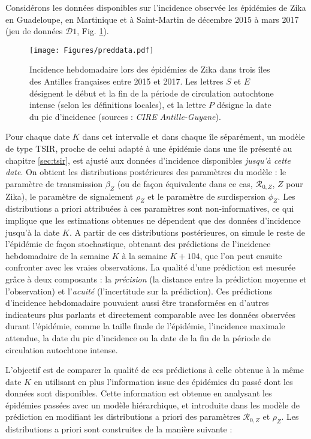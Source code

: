 Considérons les données disponibles sur l'incidence observée les épidémies de Zika en Guadeloupe, en Martinique et à Saint-Martin de décembre 2015 à mars 2017 (jeu de données $\mathcal{D}1$, Fig. \ref{fig:preddata}).
\begin{figure}[t]
	\centering
	\texttt{[image: Figures/preddata.pdf]}
	\caption{Incidence hebdomadaire lors des épidémies de Zika dans trois îles des Antilles françaises entre 2015 et 2017. Les lettres $S$ et $E$ désignent le début et la fin de la période de circulation autochtone intense (selon les définitions locales), et la lettre $P$ désigne la date du pic d'incidence (sources : {\em CIRE Antille-Guyane}).}
	\label{fig:preddata}
\end{figure}
Pour chaque date $K$ dans cet intervalle et dans chaque île séparément, un modèle de type TSIR, proche de celui adapté à une épidémie dans une île présenté au chapitre \ref{sec:tsir}, est ajusté aux données d'incidence disponibles {\em jusqu'à cette date}.
On obtient les distributions postérieures des paramètres du modèle : le paramètre de transmission $\beta_Z$ (ou de façon équivalente dans ce cas, $\mathcal{R}_{0,Z}$, $Z$ pour Zika), le paramètre de signalement $\rho_Z$ et le paramètre de surdispersion $\phi_Z$.
Les distributions a priori attribuées à ces paramètres sont non-informatives, ce qui implique que les estimations obtenues ne dépendent que des données d'incidence jusqu'à la date $K$. 
A partir de ces distributions postérieures, on simule le reste de l'épidémie de façon stochastique, obtenant des prédictions de l'incidence hebdomadaire de la semaine $K$ à la semaine $K+104$, que l'on peut ensuite confronter avec les vraies observations.
La qualité d'une prédiction est mesurée grâce à deux composants : la {\em précision} (la distance entre la prédiction moyenne et l'observation) et l'{\em acuité} (l'incertitude sur la prédiction).
Ces prédictions d'incidence hebdomadaire pouvaient aussi être transformées en d'autres indicateurs plus parlants et directement comparable avec les données observées durant l'épidémie, comme la taille finale de l'épidémie, l'incidence maximale attendue, la date du pic d'incidence ou la date de la fin de la période de circulation autochtone intense.

L'objectif est de comparer la qualité de ces prédictions à celle obtenue à la même date $K$ en utilisant en plus l'information issue des épidémies du passé dont les données sont disponibles.
Cette information est obtenue en analysant les épidémies passées avec un modèle hiérarchique, et introduite dans les modèle de prédiction en modifiant les distributions a priori des paramètres $\mathcal{R}_{0,Z}$ et $\rho_Z$.
Les distributions a priori sont construites de la manière suivante :

